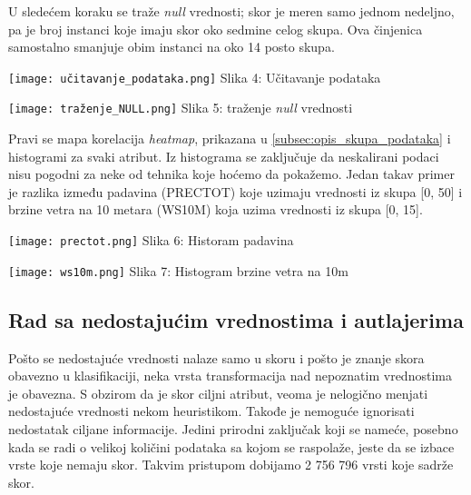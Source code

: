 \documentclass[a4paper]{article}
\begin{document}
{U sledećem koraku se traže {\em null} vrednosti; skor je meren samo jednom nedeljno, pa je broj instanci koje imaju skor oko sedmine celog skupa. Ova činjenica samostalno smanjuje obim instanci na oko 14 posto skupa.\\

\noindent\begin{minipage}{0.55\textwidth}
\texttt{[image: učitavanje\_podataka.png]}
\hphantom{aaaaaaaaa}Slika 4: Učitavanje podataka\\
\end{minipage}
\begin{minipage}{0.30\textwidth}
\texttt{[image: traženje\_NULL.png]}
Slika 5: traženje {\em null} vrednosti\\
\end{minipage}

Pravi se mapa korelacija {\em heatmap}, prikazana u \ref{subsec:opis_skupa_podataka} i histogrami za svaki atribut. Iz histograma se zaključuje da neskalirani podaci nisu pogodni za neke od tehnika koje hoćemo da pokažemo. Jedan takav primer je razlika između padavina (PRECTOT) koje uzimaju vrednosti iz skupa [0, 50] i brzine vetra na 10 metara (WS10M) koja uzima vrednosti iz skupa [0, 15].\\

\noindent\begin{minipage}{0.50\textwidth}
\texttt{[image: prectot.png]}
\hphantom{aaaaaaaa}Slika 6: Historam padavina\\
\end{minipage}
\begin{minipage}{0.50\textwidth}
\texttt{[image: ws10m.png]}
\hphantom{aa}Slika 7: Histogram brzine vetra na 10m\\
\end{minipage}

\subsection{Rad sa nedostajućim vrednostima i autlajerima}
\label{rad}

Pošto se nedostajuće vrednosti nalaze samo u skoru i pošto je znanje skora obavezno u klasifikaciji, neka vrsta transformacija nad nepoznatim vrednostima je obavezna. S obzirom da je skor ciljni atribut, veoma je nelogično menjati nedostajuće vrednosti nekom heuristikom. Takođe je nemoguće ignorisati nedostatak ciljane informacije. Jedini prirodni zaključak koji se nameće, posebno kada se radi o velikoj količini podataka sa kojom se raspolaže, jeste da se izbace vrste koje nemaju skor. Takvim pristupom dobijamo 2 756 796 vrsti koje sadrže skor.\\

}
\end{document}
